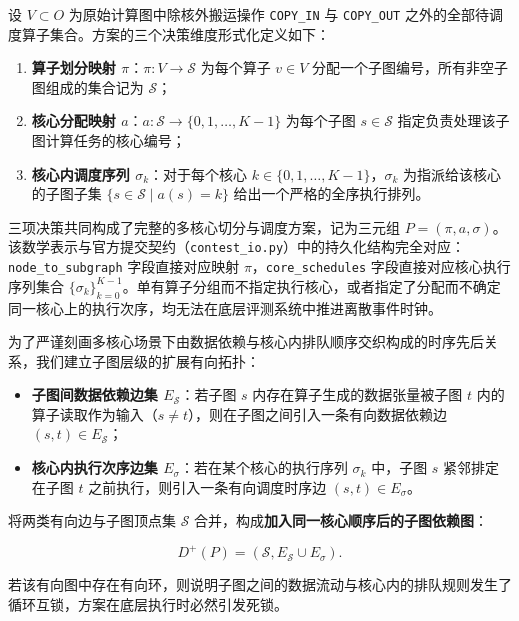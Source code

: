 \documentclass[anonymous,notoc]{gmcm2026}
\providecommand{\tightlist}{\setlength{\itemsep}{0pt}\setlength{\parskip}{0pt}}
\begin{document}
设 \(V \subset O\) 为原始计算图中除核外搬运操作 \texttt{COPY\_IN} 与 \texttt{COPY\_OUT} 之外的全部待调度算子集合。方案的三个决策维度形式化定义如下：

\begin{enumerate}
\def\labelenumi{\arabic{enumi}.}
\tightlist
\item
  \textbf{算子划分映射 \(\pi\)}：\(\pi: V \to \mathcal{S}\) 为每个算子 \(v \in V\) 分配一个子图编号，所有非空子图组成的集合记为 \(\mathcal{S}\)；
\item
  \textbf{核心分配映射 \(a\)}：\(a: \mathcal{S} \to \{0, 1, \dots, K-1\}\) 为每个子图 \(s \in \mathcal{S}\) 指定负责处理该子图计算任务的核心编号；
\item
  \textbf{核心内调度序列 \(\sigma_k\)}：对于每个核心 \(k \in \{0, 1, \dots, K-1\}\)，\(\sigma_k\) 为指派给该核心的子图子集 \(\{s \in \mathcal{S} \mid a(s) = k\}\) 给出一个严格的全序执行排列。
\end{enumerate}

三项决策共同构成了完整的多核心切分与调度方案，记为三元组 \(P = (\pi, a, \sigma)\)。该数学表示与官方提交契约（\texttt{contest\_io.py}）中的持久化结构完全对应：\texttt{node\_to\_subgraph} 字段直接对应映射 \(\pi\)，\texttt{core\_schedules} 字段直接对应核心执行序列集合 \(\{\sigma_k\}_{k=0}^{K-1}\)。单有算子分组而不指定执行核心，或者指定了分配而不确定同一核心上的执行次序，均无法在底层评测系统中推进离散事件时钟。

为了严谨刻画多核心场景下由数据依赖与核心内排队顺序交织构成的时序先后关系，我们建立子图层级的扩展有向拓扑：

\begin{itemize}
\tightlist
\item
  \textbf{子图间数据依赖边集 \(E_{\mathcal{S}}\)}：若子图 \(s\) 内存在算子生成的数据张量被子图 \(t\) 内的算子读取作为输入（\(s \ne t\)），则在子图之间引入一条有向数据依赖边 \((s, t) \in E_{\mathcal{S}}\)；
\item
  \textbf{核心内执行次序边集 \(E_\sigma\)}：若在某个核心的执行序列 \(\sigma_k\) 中，子图 \(s\) 紧邻排定在子图 \(t\) 之前执行，则引入一条有向调度时序边 \((s, t) \in E_\sigma\)。
\end{itemize}

将两类有向边与子图顶点集 \(\mathcal{S}\) 合并，构成\textbf{加入同一核心顺序后的子图依赖图}：

\begin{equation}
D^+(P) = (\mathcal{S}, E_{\mathcal{S}} \cup E_\sigma).
\end{equation}

若该有向图中存在有向环，则说明子图之间的数据流动与核心内的排队规则发生了循环互锁，方案在底层执行时必然引发死锁。
\end{document}
